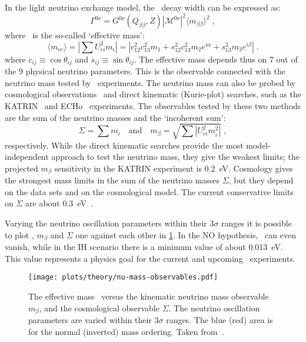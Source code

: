 In the light neutrino exchange model, the \onbb\ decay width can be expressed as:
\[
  \Gamma^{0\nu} = G^{0\nu}(Q_{\beta\beta}, Z)
                  |\mathcal{M}^{0\nu}|^2
                  \langle{m_{\beta\beta}}\rangle^2 \;,
\]
where \mbb\ is the so-called `effective mass':
\[
  \langle m_{ee} \rangle = \left| \sum U_{ei}^2 m_i \right|
                         = |c^2_{12} c^2_{13} m_1 + s^2_{12} c^2_{13} m_2 e^{i\alpha}
                            + s^2_{13} m_3 e^{i\beta}| \;.
\]
where $c_{ij} \equiv \cos{\theta_{ij}}$ and $s_{ij} \equiv \sin{\theta_{ij}}$.
The effective mass depends thus on 7 out of the 9 physical neutrino parameters.
This is the observable connected with the neutrino mass tested by \onbb\
experiments.  The neutrino mass can also be probed by cosmological
observations~\cite{Gerbino2018} and direct kinematic (Kurie-plot) searches,
such as the KATRIN~\cite{Aker2019} and ECHo~\cite{Gastaldo2018} experiments.
The observables tested by these two methods are the sum of the neutrino masses
and the `incoherent sum':
\[
  \Sigma = \sum m_i \quad \text{and} \quad m_\beta
         = \sqrt{\sum |U_{ei}^2 m_i^2|} \;,
\]
respectively. While the direct kinematic searches provide the most
model-independent approach to test the neutrino mass, they give the weakest
limits; the projected $m_\beta$ sensitivity in the KATRIN experiment is 0.2~eV.
Cosmology gives the strongest mass limits in the sum of the neutrino masses
$\Sigma$, but they depend on the data sets and on the cosmological model. The
current conservative limits on $\Sigma$ are about 0.3~eV~\cite{Aghanim2018}.

Varying the neutrino oscillation parameters within their $3\sigma$ ranges it is
possible to plot \mbb, $m_\beta$ and $\Sigma$ one against each other in
\cref{fig:nbb:mass-obs}. In the NO hypothesis, \mbb\ can even vanish, while
in the IH scenario there is a minimum value of about 0.013~eV. This value
represents a physics goal for the current and upcoming \onbb\ experiments.

\begin{figure}
  \centering
  \texttt{[image: plots/theory/nu-mass-observables.pdf]}
  \caption{%
    The effective mass \mbb\ versus the kinematic neutrino mass observable
    $m_\beta$, and the cosmological observable $\Sigma$. The neutrino
    oscillation parameters are varied within their $3\sigma$ ranges. The blue
    (red) area is for the normal (inverted) mass ordering. Taken
    from~\cite{Dolinski2019}.
  }\label{fig:nbb:mass-obs}
\end{figure}

